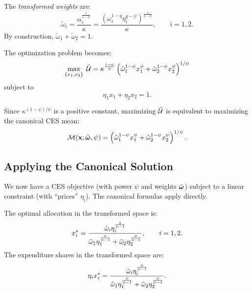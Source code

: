 \begin{definition}
\label{def:transformed-weights}
The \emph{transformed weights} are:
\begin{equation}
\label{eq:tilde-omega}
\tilde{\omega}_i = \frac{\alpha_i^{\frac{1}{1-\psi}}}{\kappa} = \frac{\left( \omega_i^{1-q} \eta_i^{q-\psi} \right)^{\frac{1}{1-\psi}}}{\kappa}, \qquad i = 1, 2.
\end{equation}
By construction, $\tilde{\omega}_1 + \tilde{\omega}_2 = 1$.
\end{definition}

\begin{proposition}
\label{prop:canonical-transformed}
The optimization problem becomes:
\begin{equation}
\label{eq:canonical-transformed}
\max_{\{x_1, x_2\}} \; \tilde{\mathcal{U}} = \kappa^{\frac{1-\psi}{\psi}} \left( \tilde{\omega}_1^{1-\psi} x_1^{\psi} + \tilde{\omega}_2^{1-\psi} x_2^{\psi} \right)^{1/\psi}
\end{equation}
subject to
\begin{equation}
\eta_1 x_1 + \eta_2 x_2 = 1.
\end{equation}
\end{proposition}

Since $\kappa^{(1-\psi)/\psi}$ is a positive constant, maximizing $\tilde{\mathcal{U}}$ is equivalent to maximizing the canonical CES mean:
\begin{equation}
\mathcal{M}(\mathbf{x}; \tilde{\boldsymbol{\omega}}, \psi) = \left( \tilde{\omega}_1^{1-\psi} x_1^{\psi} + \tilde{\omega}_2^{1-\psi} x_2^{\psi} \right)^{1/\psi}.
\end{equation}

\subsection{Applying the Canonical Solution}
\label{subsec:apply-canonical}

We now have a CES objective (with power $\psi$ and weights $\tilde{\boldsymbol{\omega}}$) subject to a linear constraint (with ``prices'' $\eta_i$). The canonical formulas apply directly.

\begin{proposition}
\label{prop:solution-transformed}
The optimal allocation in the transformed space is:
\begin{equation}
\label{eq:x-star}
x_i^{*} = \frac{\tilde{\omega}_i \eta_i^{\frac{1}{\psi - 1}}}{\tilde{\omega}_1 \eta_1^{\frac{\psi}{\psi-1}} + \tilde{\omega}_2 \eta_2^{\frac{\psi}{\psi-1}}}, \qquad i = 1, 2.
\end{equation}
The expenditure shares in the transformed space are:
\begin{equation}
\label{eq:shares-transformed}
\eta_i x_i^{*} = \frac{\tilde{\omega}_i \eta_i^{\frac{\psi}{\psi - 1}}}{\tilde{\omega}_1 \eta_1^{\frac{\psi}{\psi-1}} + \tilde{\omega}_2 \eta_2^{\frac{\psi}{\psi-1}}}.
\end{equation}
\end{proposition}

